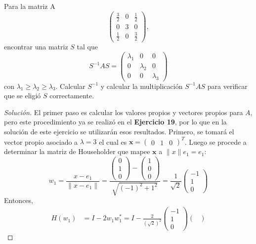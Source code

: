 \documentclass[12pt]{book}
\newenvironment{solucion}
  {\renewcommand\qedsymbol{$\square$}\begin{proof}[Solución]}
  {\end{proof}}
\begin{document}
\eje Para la matriz A
    \[
        \begin{pmatrix}
            \frac{3}{2} & 0 & \frac{1}{2}\\
            0 & 3 & 0\\
            \frac{1}{2} & 0 & \frac{3}{2}
        \end{pmatrix},
    \]
encontrar una matriz $S$ tal que
    \[
        S^{-1}AS=\begin{pmatrix}
            \lambda_1 & 0 & 0\\
            0 & \lambda_2 & 0\\
            0 & 0 & \lambda_3
        \end{pmatrix}
    \]
con $\lambda_1\geq\lambda_2\geq\lambda_3$. Calcular $S^{-1}$ y calcular la multiplicación $S^{-1}AS$ para verificar que se eligió $S$ correctamente.
\begin{solucion}
El primer paso es calcular los valores propios y vectores propios para $A$, pero este procedimiento ya se realizó en el \textbf{Ejercicio 19}, por lo que en la solución de este ejercicio se utilizarán esos resultados.
Primero, se tomará el vector propio asociado a $\lambda=3$ el cual es $\bm{x}=\begin{pmatrix}0 & 1 & 0\end{pmatrix}^T$. Luego se procede a determinar la matriz de Householder que mapee $\bm{x}$ a $\lVert x\rVert e_1=e_1$:
    \[
        w_1=\frac{x-e_1}{\lVert x-e_1\rVert}=\frac{\begin{pmatrix}
            0\\
            1\\
            0
        \end{pmatrix}-\begin{pmatrix}
            1\\
            0\\
            0
        \end{pmatrix}}{\sqrt{(-1)^2+1^2}}=\frac{1}{\sqrt{2}}\begin{pmatrix}
            -1\\
            1\\0
        \end{pmatrix}
    \]
Entonces,
\begin{align*}
    H(w_1)&=I-2w_1w_1^*=I-\frac{2}{\left(\sqrt{2}\right)^2}\begin{pmatrix}
        -1\\
        1\\
        0
    \end{pmatrix}\begin{pmatrix}

\end{pmatrix}
\end{align*}
\end{solucion}
\end{document}
